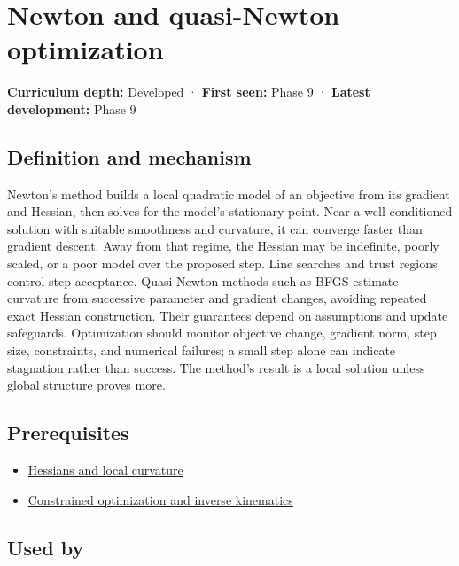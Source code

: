 \hypertarget{appendix-54c8f5828387}{}\label{referencestart:appendix-54c8f5828387}
\section{Newton and quasi-Newton optimization}\label{appendix-54c8f5828387-newton-and-quasi-newton-optimization}

\textbf{Curriculum depth:} Developed · \textbf{First seen:} Phase 9 · \textbf{Latest development:} Phase 9

\subsection{Definition and mechanism}\label{appendix-54c8f5828387-definition-and-mechanism}

Newton's method builds a local quadratic model of an objective from its gradient and Hessian, then solves for the model's stationary point. Near a well-conditioned solution with suitable smoothness and curvature, it can converge faster than gradient descent. Away from that regime, the Hessian may be indefinite, poorly scaled, or a poor model over the proposed step. Line searches and trust regions control step acceptance. Quasi-Newton methods such as BFGS estimate curvature from successive parameter and gradient changes, avoiding repeated exact Hessian construction. Their guarantees depend on assumptions and update safeguards. Optimization should monitor objective change, gradient norm, step size, constraints, and numerical failures; a small step alone can indicate stagnation rather than success. The method's result is a local solution unless global structure proves more.

\subsection{Prerequisites}\label{appendix-54c8f5828387-prerequisites}

\begin{itemize}
\tightlist
\item
  \hyperref[appendix-6ac071f8b50c]{Hessians and local curvature}
\item
  \hyperref[appendix-29f4bea4c2bb]{Constrained optimization and inverse kinematics}
\end{itemize}

\subsection{Used by}\label{appendix-54c8f5828387-used-by}

